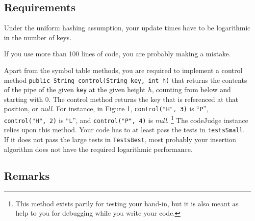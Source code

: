 \documentclass{tufte-handout}
\begin{document}
\subsection{Requirements}

Under the uniform hashing assumption, your update times have to be logarithmic in the number of keys.

If you use more than 100 lines of code, you are probably making a mistake.

Apart from the symbol table methods, you are required to implement a control method {\tt public String control(String key, int h)} that returns the contents of the pipe of the given {\tt key} at the given height $h$, counting from below and starting with $0$.
The control method returns the key that is referenced at that position, or \emph{null}.
For instance, in Figure 1, {\tt control("H", 3)} is ``{\tt P}'', {\tt control("H", 2)} is ``{\tt L}'', and {\tt control("P", 4)} is \emph{null}.
\footnote{This method exists partly for testing your hand-in, but it is also meant as help to you for debugging while you write your code.}
The codeJudge instance relies upon this method. 
Your code has to at least pass the tests in \texttt{testsSmall}.
If it does not pass the large tests in \texttt{TestsBest}, most probably your insertion algorithm does not have the required logarithmic performance.
\subsection{Remarks}
\end{document}

